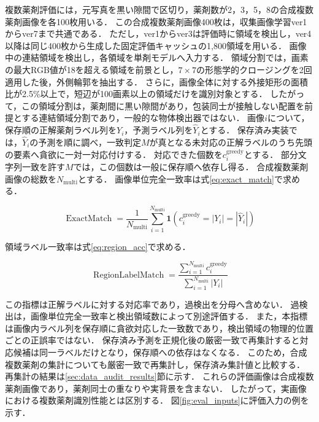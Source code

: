 \documentclass[uplatex,dvipdfmx]{jsarticle}
\begin{document}
複数薬剤評価には，元写真を黒い隙間で区切り，薬剤数が2，3，5，8の合成複数薬剤画像を各100枚用いる．
この合成複数薬剤画像400枚は，収集画像学習ver1からver7まで共通である．
ただし，ver1からver3は評価時に領域を検出し，ver4以降は同じ400枚から生成した固定評価キャッシュの1,800領域を用いる．
画像中の連結領域を検出し，各領域を単剤モデルへ入力する．
領域分割では，画素の最大RGB値が18を超える領域を前景とし，$7\times7$の形態学的クロージングを2回適用した後，外側輪郭を抽出する．
さらに，画像全体に対する外接矩形の面積比が2.5\%以上で，短辺が100画素以上の領域だけを識別対象とする．
したがって，この領域分割は，薬剤間に黒い隙間があり，包装同士が接触しない配置を前提とする連結領域分割であり，一般的な物体検出器ではない．
画像$i$について，保存順の正解薬剤ラベル列を$Y_i$，予測ラベル列を$\hat{Y}_i$とする．
保存済み実装では，$\hat{Y}_i$の予測を順に調べ，一致判定$M$が真となる未対応の正解ラベルのうち先頭の要素へ貪欲に一対一対応付けする．
対応できた個数を$c_i^{\mathrm{greedy}}$とする．
部分文字列一致を許す$M$では，この個数は一般に保存順へ依存し得る．
合成複数薬剤画像の総数を$N_{\mathrm{multi}}$とする．
画像単位完全一致率は式\eqref{eq:exact_match}で求める．

\begin{equation}
  \operatorname{ExactMatch}
  =
  \frac{1}{N_{\mathrm{multi}}}
  \sum_{i=1}^{N_{\mathrm{multi}}}
  \mathbf{1}\!\left(c_i^{\mathrm{greedy}}=|Y_i|=|\hat{Y}_i|\right)
  \label{eq:exact_match}
\end{equation}

領域ラベル一致率は式\eqref{eq:region_acc}で求める．

\begin{equation}
  \operatorname{RegionLabelMatch}
  =
  \frac{\sum_{i=1}^{N_{\mathrm{multi}}}c_i^{\mathrm{greedy}}}
       {\sum_{i=1}^{N_{\mathrm{multi}}}|Y_i|}
  \label{eq:region_acc}
\end{equation}

この指標は正解ラベルに対する対応率であり，過検出を分母へ含めない．
過検出は，画像単位完全一致率と検出領域数によって別途評価する．
また，本指標は画像内ラベル列を保存順に貪欲対応した一致数であり，検出領域の物理的位置ごとの正誤率ではない．
保存済み予測を正規化後の厳密一致で再集計すると対応候補は同一ラベルだけとなり，保存順への依存はなくなる．
このため，合成複数薬剤の集計についても厳密一致で再集計し，保存済み集計値と比較する．
再集計の結果は\ref{sec:data_audit_results}節に示す．
これらの評価画像は合成複数薬剤画像であり，薬剤同士の重なりや実背景を含まない．
したがって，実画像における複数薬剤識別性能とは区別する．
図\ref{fig:eval_inputs}に評価入力の例を示す．
\end{document}
